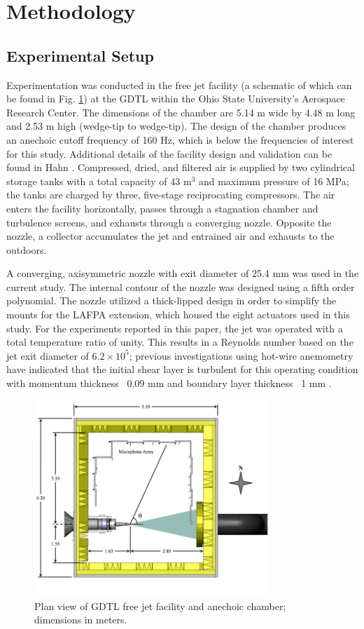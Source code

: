 \documentclass[english]{aiaa-tc}
\begin{document}
\section{Methodology}
\subsection{Experimental Setup\label{expersetup}}
Experimentation was conducted in the free jet facility (a schematic of which can be found in Fig. \ref{GDTLschematic}) at the GDTL within the Ohio State University's Aerospace Research Center.
The dimensions of the chamber are 5.14 m wide by 4.48 m long and 2.53 m high (wedge-tip to wedge-tip).
The design of the chamber produces an anechoic cutoff frequency of 160 Hz, which is below the frequencies of interest for this study.
Additional details of the facility design and validation can be found in Hahn \cite{Hahn2011}.
Compressed, dried, and filtered air is supplied by two cylindrical storage tanks with a total capacity of 43 m$^3$ and maximum pressure of 16 MPa; the tanks are charged by three, five-stage reciprocating compressors.
The air enters the facility horizontally, passes through a stagnation chamber and turbulence screens, and exhausts through a converging nozzle.
Opposite the nozzle, a collector accumulates the jet and entrained air and exhausts to the outdoors.

A converging, axisymmetric nozzle with exit diameter of 25.4 mm was used in the current study.
The internal contour of the nozzle was designed using a fifth order polynomial. The nozzle utilized a thick-lipped design in order to simplify the mounts for the LAFPA extension, which housed the eight actuators used in this study.
For the experiments reported in this paper, the jet was operated with a total temperature ratio of unity.
This results in a Reynolds number based on the jet exit diameter of $6.2 \times 10^{5}$; previous investigations using hot-wire anemometry have indicated that the initial shear layer is turbulent for this operating condition with momentum thickness ~0.09 mm and boundary layer thickness ~1 mm \cite{kfm2009-1}.
\begin{figure}
	\begin{center}
		\includegraphics[width=3.5in]{GDTL_facility_schematic.png}
		\caption{Plan view of GDTL free jet facility and anechoic chamber; dimensions in meters.}\label{GDTLschematic}
	\end{center}
\end{figure}
\end{document}
